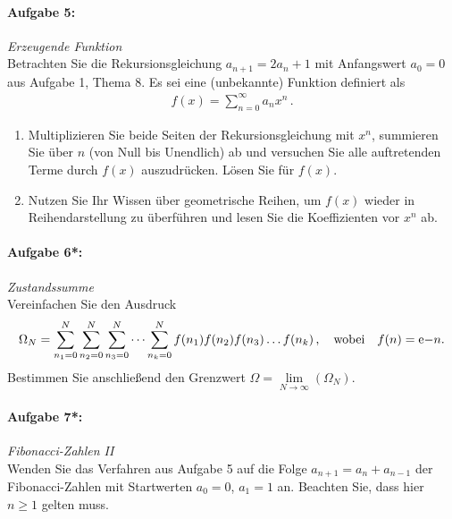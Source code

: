 \paragraph{Aufgabe 5: } \emph{Erzeugende Funktion}\\[0.2cm]
Betrachten Sie die Rekursionsgleichung $a_{n+1}=2a_n+1$ mit Anfangswert $a_0=0$ aus Aufgabe 1, Thema 8. Es sei eine (unbekannte) Funktion definiert als
\begin{align*}
f(x)=\sum\limits_{n=0}^\infty a_n x^n\,.
\end{align*}
\begin{enumerate}[label=(\alph*)]
\item Multiplizieren Sie beide Seiten der Rekursionsgleichung mit $x^n$, summieren Sie über $n$ (von Null bis Unendlich) ab und versuchen Sie alle auftretenden Terme durch $f(x)$ auszudrücken. Lösen Sie für $f(x)$.
\item Nutzen Sie Ihr Wissen über geometrische Reihen, um $f(x)$ wieder in Reihendarstellung zu überführen und lesen Sie die Koeffizienten vor $x^n$ ab.
\end{enumerate}
%
\paragraph{Aufgabe 6*: } \emph{Zustandssumme}\\[0.2cm]
Vereinfachen Sie den Ausdruck
\begin{align*}
\Omega_N=\sum\limits_{n_1=0}^N\sum\limits_{n_2=0}^N\sum\limits_{n_3=0}^N\dots\sum\limits_{n_k=0}^N f(n_1)f(n_2)f(n_3)\dots f(n_k)\,, \qq{wobei}f(n)=\e{-n}.
\end{align*}
Bestimmen Sie anschließend den Grenzwert $\Omega=\lim\limits_{N\rightarrow\infty}(\Omega_N)$.
%
\paragraph{Aufgabe 7*: } \emph{Fibonacci-Zahlen II}\\[0.2cm]
Wenden Sie das Verfahren aus Aufgabe 5 auf die Folge $a_{n+1}=a_n+a_{n-1}$ der Fibonacci-Zahlen mit Startwerten $a_0=0$, $a_1=1$ an. Beachten Sie, dass hier $n\ge 1$ gelten muss.
%